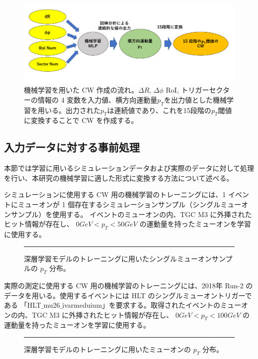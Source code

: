 \begin{figure}[tb]
  \centering
  \includegraphics[clip, width=15cm]{fig/4/MLPoverview.png}
  \caption{機械学習を用いた CW 作成の流れ。$\Delta R$, $\Delta \phi$ RoI, トリガーセクターの情報の 4 変数を入力値、横方向運動量$p_T$を出力値とした機械学習を用いる。出力された$p_T$は連続値であり、これを15段階の$p_T$閾値に変換することで CW を作成する。}
  \label{fig:MLP_over}
\end{figure}

\subsection{入力データに対する事前処理}
本節では学習に用いるシミュレーションデータおよび実際のデータに対して処理を行い、本研究の機械学習に適した形式に変換する方法について述べる。

シミュレーションに使用する CW 用の機械学習のトレーニングには、1 イベントにミューオンが 1 個存在するシミュレーションサンプル（シングルミューオンサンプル）を使用する。
イベントのミューオンの内、TGC M3 に外挿されたヒット情報が存在し、 $0 GeV < p_T < 50 GeV$ の運動量を持ったミューオンを学習に使用する。

\begin{figure}[thb]
  \centering
  \rule{8cm}{6cm}
  \caption{深層学習モデルのトレーニングに用いたシングルミューオンサンプルの $p_T$ 分布。}
  \label{fig:mu_pt_forMC}
\end{figure}

実際の測定に使用する CW 用の機械学習のトレーニングには、2018年 Run-2 のデータを用いる。使用するイベントには HLT のシングルミューオントリガーである 「HLT$\_$mu26$\_$ivarmeduium」を要求する。取得されたイベントのミューオンの内、TGC M3 に外挿されたヒット情報が存在し、 $0 GeV < p_{T} < 100 GeV$ の運動量を持ったミューオンを学習に使用する。

\begin{figure}[thb]
  \centering
  \rule{8cm}{6cm}
  \caption{深層学習モデルのトレーニングに用いたミューオンの $p_T$ 分布。}
  \label{fig:mu_pt_forData}
\end{figure}

